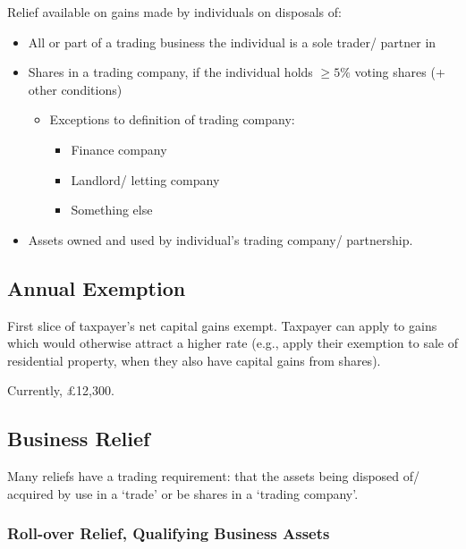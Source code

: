 \documentclass[
]{article}
\providecommand{\tightlist}{%
  \setlength{\itemsep}{0pt}\setlength{\parskip}{0pt}}
\begin{document}
Relief available on gains made by individuals on disposals of:

\begin{itemize}
\tightlist
\item
  All or part of a trading business the individual is a sole trader/
  partner in
\item
  Shares in a trading company, if the individual holds \(\geq 5\%\)
  voting shares (+ other conditions)

  \begin{itemize}
  \tightlist
  \item
    Exceptions to definition of trading company:

    \begin{itemize}
    \tightlist
    \item
      Finance company
    \item
      Landlord/ letting company
    \item
      Something else
    \end{itemize}
  \end{itemize}
\item
  Assets owned and used by individual's trading company/ partnership.
\end{itemize}

\hypertarget{annual-exemption}{%
\subsection{Annual Exemption}\label{annual-exemption}}

First slice of taxpayer's net capital gains exempt. Taxpayer can apply
to gains which would otherwise attract a higher rate (e.g., apply their
exemption to sale of residential property, when they also have capital
gains from shares).

Currently, £12,300.

\hypertarget{business-relief}{%
\subsection{Business Relief}\label{business-relief}}

Many reliefs have a trading requirement: that the assets being disposed
of/ acquired by use in a `trade' or be shares in a `trading company'.

\hypertarget{roll-over-relief-qualifying-business-assets}{%
\subsubsection{Roll-over Relief, Qualifying Business
Assets}\label{roll-over-relief-qualifying-business-assets}}
\end{document}
